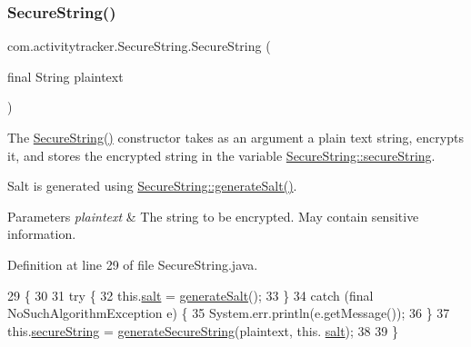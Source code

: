 \subsubsection{\texorpdfstring{Secure\+String()}{SecureString()}\hspace{0.1cm}{\footnotesize\ttfamily [1/2]}}
{\footnotesize\ttfamily com.\+activitytracker.\+Secure\+String.\+Secure\+String (\begin{DoxyParamCaption}\item[{final String}]{plaintext }\end{DoxyParamCaption})\hspace{0.3cm}{\ttfamily [package]}}

The \mbox{\hyperlink{classcom_1_1activitytracker_1_1_secure_string_a889fcbf0c1f771962ac81886f49e389e}{Secure\+String()}} constructor takes as an argument a plain text string, encrypts it, and stores the encrypted string in the variable \mbox{\hyperlink{classcom_1_1activitytracker_1_1_secure_string_a1448f7b8865c6c57cc7218662ee7f1ee}{Secure\+String\+::secure\+String}}.

Salt is generated using \mbox{\hyperlink{classcom_1_1activitytracker_1_1_secure_string_a1907ad109bb5e64291fabd3ff459ef49}{Secure\+String\+::generate\+Salt()}}.


\begin{DoxyParams}{Parameters}
{\em plaintext} & The string to be encrypted. May contain sensitive information. \\
\hline
\end{DoxyParams}


Definition at line 29 of file Secure\+String.\+java.


\begin{DoxyCode}
29                                          \{
30 
31         \textcolor{keywordflow}{try} \{
32             this.\mbox{\hyperlink{classcom_1_1activitytracker_1_1_secure_string_a8549ead1f186ff0c2520818b03d1cc21}{salt}} = \mbox{\hyperlink{classcom_1_1activitytracker_1_1_secure_string_a1907ad109bb5e64291fabd3ff459ef49}{generateSalt}}();
33         \}
34         \textcolor{keywordflow}{catch} (\textcolor{keyword}{final} NoSuchAlgorithmException e) \{
35             System.err.println(e.getMessage());
36         \}
37         this.\mbox{\hyperlink{classcom_1_1activitytracker_1_1_secure_string_a1448f7b8865c6c57cc7218662ee7f1ee}{secureString}} = \mbox{\hyperlink{classcom_1_1activitytracker_1_1_secure_string_aa2521591ab15fb4c5a2461c04b08320f}{generateSecureString}}(plaintext, this.
      \mbox{\hyperlink{classcom_1_1activitytracker_1_1_secure_string_a8549ead1f186ff0c2520818b03d1cc21}{salt}});
38 
39     \}
\end{DoxyCode}
\mbox{\label{classcom_1_1activitytracker_1_1_secure_string_a04c2f0677ecd9af147428976a11c85e2}} 
